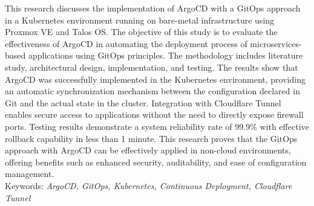 \begin{singlespace}
	This research discusses the implementation of ArgoCD with a GitOps approach in a Kubernetes environment running on bare-metal infrastructure using Proxmox VE and Talos OS. The objective of this study is to evaluate the effectiveness of ArgoCD in automating the deployment process of microservices-based applications using GitOps principles. The methodology includes literature study, architectural design, implementation, and testing. The results show that ArgoCD was successfully implemented in the Kubernetes environment, providing an automatic synchronization mechanism between the configuration declared in Git and the actual state in the cluster. Integration with Cloudflare Tunnel enables secure access to applications without the need to directly expose firewall ports. Testing results demonstrate a system reliability rate of 99.9\% with effective rollback capability in less than 1 minute. This research proves that the GitOps approach with ArgoCD can be effectively applied in non-cloud environments, offering benefits such as enhanced security, auditability, and ease of configuration management. \\[20pt]
	Keywords: \textit{ArgoCD, GitOps, Kubernetes, Continuous Deployment, Cloudflare Tunnel}
\end{singlespace}

\newpage

